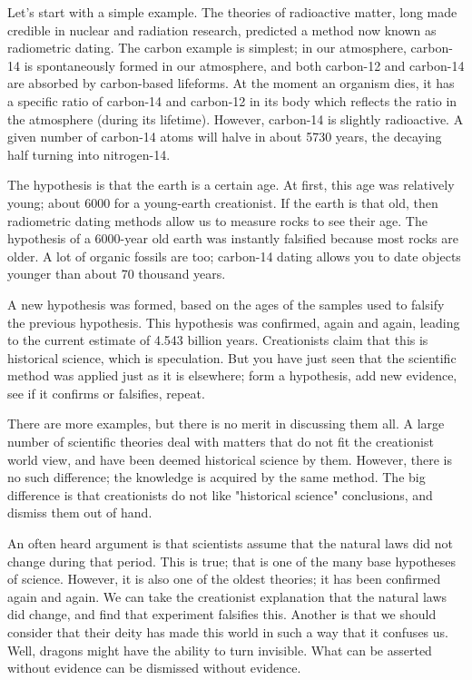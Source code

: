 \begin{multicols}{2}
Let's start with a simple example. The theories of radioactive matter, long made credible in nuclear and radiation research, predicted a method now known as radiometric dating. The carbon example is simplest; in our atmosphere, carbon-14 is spontaneously formed in our atmosphere, and both carbon-12 and carbon-14 are absorbed by carbon-based lifeforms. At the moment an organism dies, it has a specific ratio of carbon-14 and carbon-12 in its body which reflects the ratio in the atmosphere (during its lifetime). However, carbon-14 is slightly radioactive. A given number of carbon-14 atoms will halve in about 5730 years, the decaying half turning into nitrogen-14. 

The hypothesis is that the earth is a certain age. At first, this age was relatively young; about 6000 for a young-earth creationist. If the earth is that old, then radiometric dating methods allow us to measure rocks to see their age. The hypothesis of a 6000-year old earth was instantly falsified because most rocks are older. A lot of organic fossils are too; carbon-14 dating allows you to date objects younger than about 70 thousand years.

A new hypothesis was formed, based on the ages of the samples used to falsify the previous hypothesis. This hypothesis was confirmed, again and again, leading to the current estimate of 4.543 billion years. Creationists claim that this is historical science, which is speculation. But you have just seen that the scientific method was applied just as it is elsewhere; form a hypothesis, add new evidence, see if it confirms or falsifies, repeat. 

There are more examples, but there is no merit in discussing them all. A large number of scientific theories deal with matters that do not fit the creationist world view, and have been deemed historical science by them. However, there is no such difference; the knowledge is acquired by the same method. The big difference is that creationists do not like "historical science" conclusions, and dismiss them out of hand.

An often heard argument is that scientists assume that the natural laws did not change during that period. This is true; that is one of the many base hypotheses of science. However, it is also one of the oldest theories; it has been confirmed again and again. We can take the creationist explanation that the natural laws did change, and find that experiment falsifies this. Another is that we should consider that their deity has made this world in such a way that it confuses us. Well, dragons might have the ability to turn invisible. What can be asserted without evidence can be dismissed without evidence. 
\end{multicols}